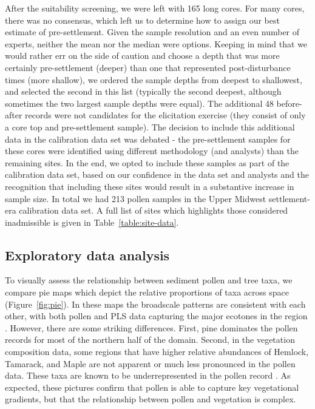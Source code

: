 \documentclass[12pt]{article}
\begin{document}
After the suitability screening, we were left with 165 long cores. For
many cores, there was no consensus, which left us to determine how to
assign our best estimate of pre-settlement. Given the sample
resolution and an even number of experts, neither the mean nor the
median were options. Keeping in mind that we would rather err on the
side of caution and choose a depth that was more certainly
pre-settlement (deeper) than one that represented post-disturbance
times (more shallow), we ordered the sample depths from deepest to
shallowest, and selected the second in this list (typically the second
deepest, although sometimes the two largest sample depths were equal).
The additional 48 before-after records were not candidates for the
elicitation exercise (they consist of only a core top and
pre-settlement sample). The decision to include this additional data
in the calibration data set was debated - the pre-settlement samples
for these cores were identified using different methodology (and
analysts) than the remaining sites. In the end, we opted to include
these samples as part of the calibration data set, based on our
confidence in the data set and analysts and the recognition that
including these sites would result in a substantive increase in sample
size. In total we had 213 pollen samples in the Upper Midwest
settlement-era calibration data set. A full list of sites which
highlights those considered inadmissible is given in
Table~\ref{table:site-data}.

\subsection{Exploratory data analysis}

To visually assess the relationship between sediment pollen and tree
taxa, we compare pie maps which depict the relative proportions of
taxa across space (Figure~\ref{fig:pie}). In these maps the broadscale
patterns are consistent with each other, with both pollen and PLS data
capturing the major ecotones in the region
\citep{solomon1985computer}.  However, there are some striking
differences. First, pine dominates the pollen records for most of the
northern half of the domain. Second, in the vegetation composition
data, some regions that have higher relative abundances of Hemlock,
Tamarack, and Maple are not apparent or much less pronounced in the
pollen data. These taxa are known to be underrepresented in the pollen
record \citep{XXX}. As expected, these pictures confirm that pollen is able
to capture key vegetational gradients, but that the relationship
between pollen and vegetation is complex.
\end{document}
